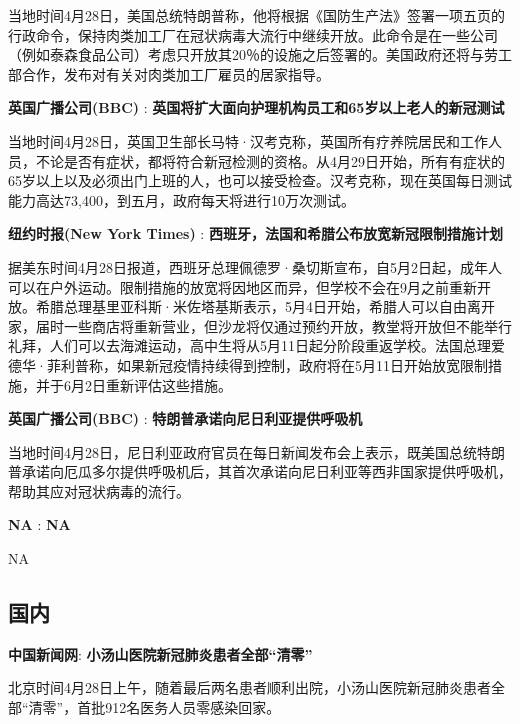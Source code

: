 \documentclass[]{article}
\begin{document}
当地时间4月28日，美国总统特朗普称，他将根据《国防生产法》签署一项五页的行政命令，保持肉类加工厂在冠状病毒大流行中继续开放。此命令是在一些公司（例如泰森食品公司）考虑只开放其20％的设施之后签署的。美国政府还将与劳工部合作，发布对有关对肉类加工厂雇员的居家指导。

\textbf{\textcolor{glaucous}{英国广播公司(BBC)}} :
\textbf{英国将扩大面向护理机构员工和65岁以上老人的新冠测试}

当地时间4月28日，英国卫生部长马特·汉考克称，英国所有疗养院居民和工作人员，不论是否有症状，都将符合新冠检测的资格。从4月29日开始，所有有症状的65岁以上以及必须出门上班的人，也可以接受检查。汉考克称，现在英国每日测试能力高达73,400，到五月，政府每天将进行10万次测试。

\textbf{\textcolor{glaucous}{纽约时报(New York Times)}} :
\textbf{西班牙，法国和希腊公布放宽新冠限制措施计划 }

据美东时间4月28日报道，西班牙总理佩德罗·桑切斯宣布，自5月2日起，成年人可以在户外运动。限制措施的放宽将因地区而异，但学校不会在9月之前重新开放。希腊总理基里亚科斯·米佐塔基斯表示，5月4日开始，希腊人可以自由离开家，届时一些商店将重新营业，但沙龙将仅通过预约开放，教堂将开放但不能举行礼拜，人们可以去海滩运动，高中生将从5月11日起分阶段重返学校。法国总理爱德华·菲利普称，如果新冠疫情持续得到控制，政府将在5月11日开始放宽限制措施，并于6月2日重新评估这些措施。

\textbf{\textcolor{glaucous}{英国广播公司(BBC)}} :
\textbf{特朗普承诺向尼日利亚提供呼吸机 }

当地时间4月28日，尼日利亚政府官员在每日新闻发布会上表示，既美国总统特朗普承诺向厄瓜多尔提供呼吸机后，其首次承诺向尼日利亚等西非国家提供呼吸机，帮助其应对冠状病毒的流行。

\textbf{\textcolor{glaucous}{NA}} : \textbf{NA}

NA

\vspace{-5mm}

\hypertarget{section-1}{%
\subsection{\texorpdfstring{\textcolor{glaucous}{\Large 国内}}{}}\label{section-1}}

\vspace{-3mm}

\textbf{\textcolor{glaucous}{中国新闻网}}:
\textbf{小汤山医院新冠肺炎患者全部``清零'' }

北京时间4月28日上午，随着最后两名患者顺利出院，小汤山医院新冠肺炎患者全部``清零''，首批912名医务人员零感染回家。
\end{document}
